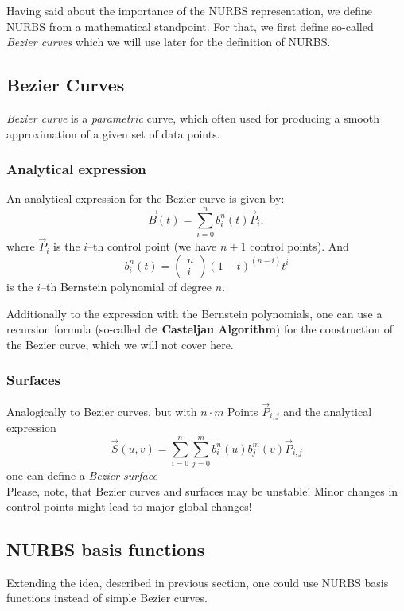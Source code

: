 Having said about the importance of the NURBS representation, we define NURBS from a mathematical standpoint. For that, we first define so-called \textit{Bezier curves} which we will use later for the definition of NURBS.
\subsection{Bezier Curves}
\emph{Bezier curve} is a \textit{parametric} curve, which often used for producing a smooth approximation of a given set of data points.
\subsubsection{Analytical expression} 
An analytical expression for the Bezier curve is given by:
\begin{equation*}
\vec{B}(t)=\sum\limits_{i=0}^n b_i^n(t) \vec{P}_i,
\end{equation*}
where $\vec{P}_i$ is the $i$--th control point (we have $n+1$ control points). And
\begin{equation*}
b_i^n(t)=\left(\begin{array}{c}n\\i\end{array}\right)(1-t)^{(n-i)}t^i
\end{equation*}
is the $i$--th Bernstein polynomial of degree $n$.

Additionally to the expression with the Bernstein polynomials, one can use a recursion formula (so-called \textbf{de Casteljau Algorithm}) for the construction of the Bezier curve, which we will not cover here.
\subsubsection{Surfaces}
Analogically to Bezier curves, but with $n\cdot m$ Points $\vec{P}_{i,j}$ and the analytical expression
\begin{equation*}
\vec{S}(u,v)=\sum\limits_{i=0}^n \sum\limits_{j=0}^m b_i^n(u) b_j^m(v) \vec{P}_{i,j}
\end{equation*}
one can define a \textit{Bezier surface}
\\
Please, note, that Bezier curves and surfaces may be unstable! Minor changes in control points might lead to major global changes!


\subsection{NURBS basis functions}
Extending the idea, described in previous section, one could use NURBS basis functions instead of simple Bezier curves. 

